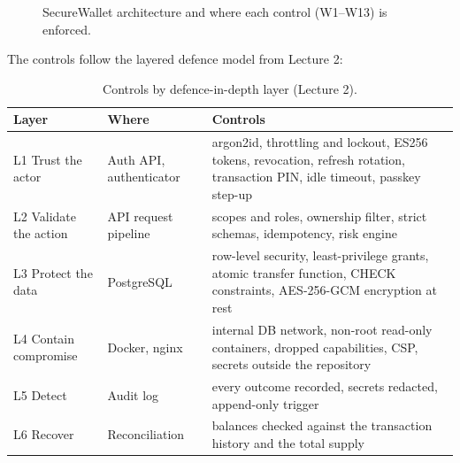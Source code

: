 \documentclass[11pt,a4paper]{article}
\newcommand{\code}[1]{\texttt{#1}}
\begin{document}
\begin{figure}[H]
\caption{SecureWallet architecture and where each control (W1--W13) is enforced.}
\label{fig:arch}
\end{figure}

The controls follow the layered defence model from Lecture 2:

\begin{table}[H]
\centering\small
\caption{Controls by defence-in-depth layer (Lecture 2).}
\begin{tabularx}{\textwidth}{P{3.4cm}P{3.6cm}Y}
\toprule
Layer & Where & Controls \\
\midrule
L1 Trust the actor & Auth API, authenticator & argon2id, throttling and lockout, ES256 tokens, revocation, refresh rotation, transaction PIN, idle timeout, passkey step-up \\
L2 Validate the action & API request pipeline & scopes and roles, ownership filter, strict schemas, idempotency, risk engine \\
L3 Protect the data & PostgreSQL & row-level security, least-privilege grants, atomic transfer function, CHECK constraints, AES-256-GCM encryption at rest \\
L4 Contain compromise & Docker, nginx & internal DB network, non-root read-only containers, dropped capabilities, CSP, secrets outside the repository \\
L5 Detect & Audit log & every outcome recorded, secrets redacted, append-only trigger \\
L6 Recover & Reconciliation & balances checked against the transaction history and the total supply \\
\bottomrule
\end{tabularx}
\end{table}
\end{document}
